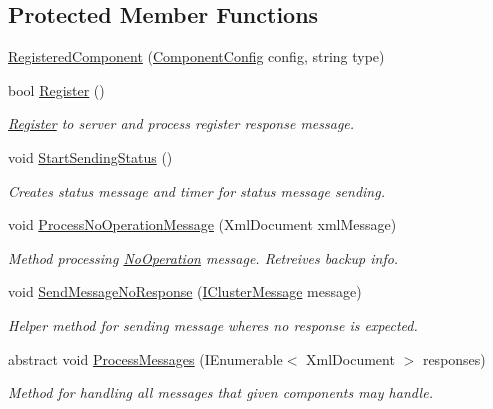 \subsection*{Protected Member Functions}
\begin{DoxyCompactItemize}
\item 
\hyperlink{class_cluster_utils_1_1_registered_component_a83b5d230bde822e0fb192b51ebbd2fbc}{Registered\+Component} (\hyperlink{class_cluster_utils_1_1_component_config}{Component\+Config} config, string type)
\item 
bool \hyperlink{class_cluster_utils_1_1_registered_component_a6d986609962aeed78b9a3d091ea5b61c}{Register} ()
\begin{DoxyCompactList}\small\item\em \hyperlink{class_register}{Register} to server and process register response message. \end{DoxyCompactList}\item 
void \hyperlink{class_cluster_utils_1_1_registered_component_afb37c02d49d01aa9accfe203ba89f468}{Start\+Sending\+Status} ()
\begin{DoxyCompactList}\small\item\em Creates status message and timer for status message sending. \end{DoxyCompactList}\item 
void \hyperlink{class_cluster_utils_1_1_registered_component_a83cc1338969d8a9631d81900fc1ddec2}{Process\+No\+Operation\+Message} (Xml\+Document xml\+Message)
\begin{DoxyCompactList}\small\item\em Method processing \hyperlink{class_no_operation}{No\+Operation} message. Retreives backup info. \end{DoxyCompactList}\item 
void \hyperlink{class_cluster_utils_1_1_registered_component_aa06be104c5cf7315d1a6ace42e1e1fc8}{Send\+Message\+No\+Response} (\hyperlink{interface_cluster_messages_1_1_i_cluster_message}{I\+Cluster\+Message} message)
\begin{DoxyCompactList}\small\item\em Helper method for sending message where\textquotesingle{}s no response is expected. \end{DoxyCompactList}\item 
abstract void \hyperlink{class_cluster_utils_1_1_registered_component_ad5ea6fe7d138e7c6bb457c7dca203040}{Process\+Messages} (I\+Enumerable$<$ Xml\+Document $>$ responses)
\begin{DoxyCompactList}\small\item\em Method for handling all messages that given components may handle. \end{DoxyCompactList}\end{DoxyCompactItemize}
